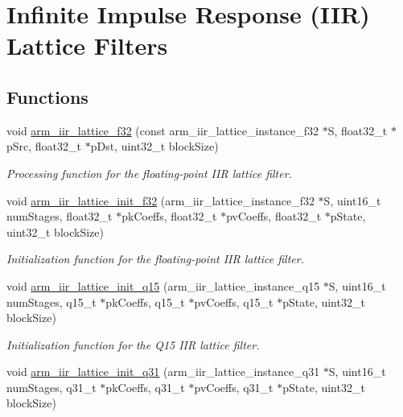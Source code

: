 \hypertarget{group__IIR__Lattice}{}\section{Infinite Impulse Response (I\+IR) Lattice Filters}
\label{group__IIR__Lattice}
\subsection*{Functions}
\begin{DoxyCompactItemize}
\item 
void \hyperlink{group__IIR__Lattice_ga56164a0fe48619b8ceec160347bdd2ff}{arm\+\_\+iir\+\_\+lattice\+\_\+f32} (const arm\+\_\+iir\+\_\+lattice\+\_\+instance\+\_\+f32 $\ast$S, float32\+\_\+t $\ast$p\+Src, float32\+\_\+t $\ast$p\+Dst, uint32\+\_\+t block\+Size)
\begin{DoxyCompactList}\small\item\em Processing function for the floating-\/point I\+IR lattice filter. \end{DoxyCompactList}\item 
void \hyperlink{group__IIR__Lattice_gaed3b0230bb77439dc902daa625985e04}{arm\+\_\+iir\+\_\+lattice\+\_\+init\+\_\+f32} (arm\+\_\+iir\+\_\+lattice\+\_\+instance\+\_\+f32 $\ast$S, uint16\+\_\+t num\+Stages, float32\+\_\+t $\ast$pk\+Coeffs, float32\+\_\+t $\ast$pv\+Coeffs, float32\+\_\+t $\ast$p\+State, uint32\+\_\+t block\+Size)
\begin{DoxyCompactList}\small\item\em Initialization function for the floating-\/point I\+IR lattice filter. \end{DoxyCompactList}\item 
void \hyperlink{group__IIR__Lattice_ga1f4bc2dd3d5641e96815d3a5aad58998}{arm\+\_\+iir\+\_\+lattice\+\_\+init\+\_\+q15} (arm\+\_\+iir\+\_\+lattice\+\_\+instance\+\_\+q15 $\ast$S, uint16\+\_\+t num\+Stages, q15\+\_\+t $\ast$pk\+Coeffs, q15\+\_\+t $\ast$pv\+Coeffs, q15\+\_\+t $\ast$p\+State, uint32\+\_\+t block\+Size)
\begin{DoxyCompactList}\small\item\em Initialization function for the Q15 I\+IR lattice filter. \end{DoxyCompactList}\item 
void \hyperlink{group__IIR__Lattice_gab686c14175581797d9c3ad7bf1d5cc1e}{arm\+\_\+iir\+\_\+lattice\+\_\+init\+\_\+q31} (arm\+\_\+iir\+\_\+lattice\+\_\+instance\+\_\+q31 $\ast$S, uint16\+\_\+t num\+Stages, q31\+\_\+t $\ast$pk\+Coeffs, q31\+\_\+t $\ast$pv\+Coeffs, q31\+\_\+t $\ast$p\+State, uint32\+\_\+t block\+Size)

\end{DoxyCompactItemize}
